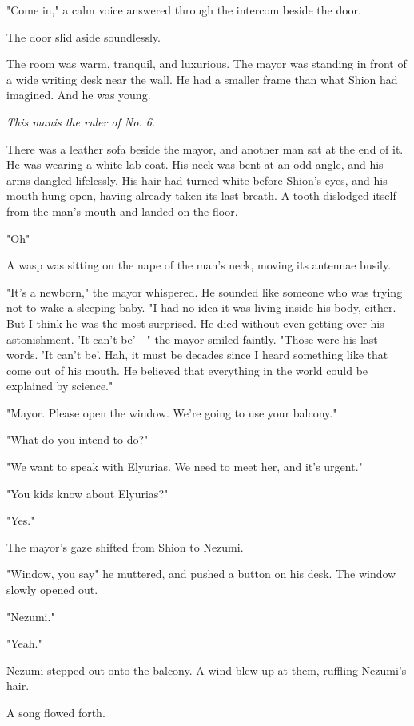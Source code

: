 "Come in," a calm voice answered through the intercom beside the door.

The door slid aside soundlessly.

The room was warm, tranquil, and luxurious. The mayor was standing in
front of a wide writing desk near the wall. He had a smaller frame than
what Shion had imagined. And he was young.

\emph{This man\el is the ruler of No. 6.}

There was a leather sofa beside the mayor, and another man sat at the
end of it. He was wearing a white lab coat. His neck was bent at an odd
angle, and his arms dangled lifelessly. His hair had turned white before
Shion's eyes, and his mouth hung open, having already taken its last
breath. A tooth dislodged itself from the man's mouth and landed on the
floor.

"Oh\el "

A wasp was sitting on the nape of the man's neck, moving its antennae
busily.

"It's a newborn," the mayor whispered. He sounded like someone who was
trying not to wake a sleeping baby. "I had no idea it was living inside
his body, either. But I think he was the most surprised. He died without
even getting over his astonishment. 'It can't be'---" the mayor smiled
faintly. "Those were his last words. 'It can't be'. Hah, it must be
decades since I heard something like that come out of his mouth. He
believed that everything in the world could be explained by science."

"Mayor. Please open the window. We're going to use your balcony."

"What do you intend to do?"

"We want to speak with Elyurias. We need to meet her, and it's urgent."

"You kids know about Elyurias?"

"Yes."

The mayor's gaze shifted from Shion to Nezumi.

"Window, you say\el " he muttered, and pushed a button on his desk. The
window slowly opened out.

"Nezumi."

"Yeah."

Nezumi stepped out onto the balcony. A wind blew up at them, ruffling
Nezumi's hair.

A song flowed forth.


